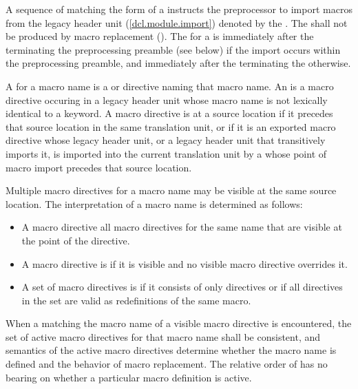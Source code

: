 \begin{after}
\begin{std.txt}
\alinea
A sequence of  matching the form
of a 
instructs the preprocessor to import macros from the legacy header unit
(\ref{dcl.module.import}) denoted by the .
The \tcode{;}  shall not be produced by
macro replacement ().
The  for a  is
immediately after the \tcode{;} terminating the preprocessing preamble
(see below) if the import occurs within the preprocessing preamble, and
immediately after the \tcode{;} terminating the 
otherwise.

\alinea
A  for a macro name is a  or
 directive naming that macro name.
An  is
a macro directive occuring in a legacy header unit
whose macro name is not lexically identical to a keyword.
A macro directive is  at a source location
if it precedes that source location in the same translation unit, or
if it is an exported macro directive whose legacy header unit,
or a legacy header unit that transitively imports it,
is imported into the current translation unit by a 
whose point of macro import precedes that source location.

\color{addclr}
\alinea
Multiple macro directives for a macro name may be visible at the same
source location.
The interpretation of a macro name is determined as follows:
\begin{itemize}
\item
\color{addclr}
A macro directive  all macro directives for the same name
that are visible at the point of the directive.
\item
\color{addclr}
A macro directive is  if it is visible and
no visible macro directive overrides it.
\item
\color{addclr}
A set of macro directives is  if it consists of only
 directives or if all  directives in the set
are valid as redefinitions of the same macro.
\end{itemize}
\color{addclr}
When a  matching the macro name of a visible
macro directive is encountered, the set of active macro directives for that
macro name shall be consistent, and semantics of the active macro directives
determine whether the macro name is defined and the behavior of macro
replacement.
\enternote
The relative order of  has no bearing on whether a
particular macro definition is active.
\exitnote


\end{std.txt}
\end{after}
